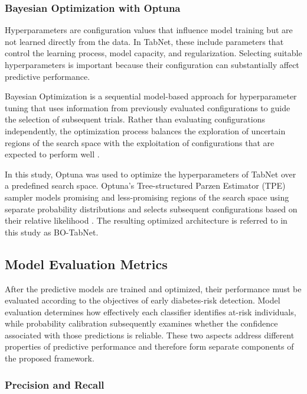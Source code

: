\subsubsection{Bayesian Optimization with Optuna}

Hyperparameters are configuration values that influence model training but
are not learned directly from the data. In TabNet, these include parameters
that control the learning process, model capacity, and regularization.
Selecting suitable hyperparameters is important because their configuration
can substantially affect predictive performance.

Bayesian Optimization is a sequential model-based approach for
hyperparameter tuning that uses information from previously evaluated
configurations to guide the selection of subsequent trials. Rather than
evaluating configurations independently, the optimization process balances
the exploration of uncertain regions of the search space with the
exploitation of configurations that are expected to perform well
\cite{bischl_hpo_2023}.

In this study, Optuna was used to optimize the hyperparameters of TabNet
over a predefined search space. Optuna's Tree-structured Parzen Estimator
(TPE) sampler models promising and less-promising regions of the search
space using separate probability distributions and selects subsequent
configurations based on their relative likelihood
\cite{optuna_tpe}. The resulting optimized architecture is referred to in
this study as BO-TabNet.

\subsection{Model Evaluation Metrics}

After the predictive models are trained and optimized, their performance
must be evaluated according to the objectives of early diabetes-risk
detection. Model evaluation determines how effectively each classifier
identifies at-risk individuals, while probability calibration subsequently
examines whether the confidence associated with those predictions is
reliable. These two aspects address different properties of predictive
performance and therefore form separate components of the proposed
framework.

\subsubsection{Precision and Recall}

